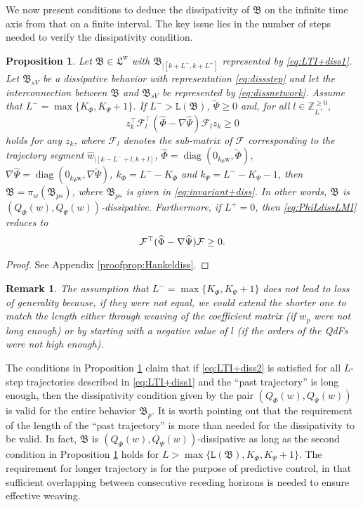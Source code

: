 \documentclass[11pt,print,draftcls,onecolumn,romanappendices]{ieeecolor}
\newtheorem{prop}[thm]{Proposition}
\newtheorem{rem}{Remark}
\DeclareMathOperator{\diag}{diag}
\newcommand{\Znn}[1]{\mathbb{Z}^{\geq0}_{#1}}
\newcommand{\LTI}[1]{\mathfrak{L}^{#1}}
\newcommand{\lag}[1]{\mathtt{L}\left(#1\right)}
\newcommand{\proj}[2]{\pi_{#1}\left(#2\right)}
\newcommand{\revise}[1]{{\color{black} #1}}
\newcommand{\B}{\mathfrak{B}}
\newcommand{\F}{\mathcal{F}}
\newcommand{\bint}[1]{{|[#1]}}
\begin{document}
We now present conditions to deduce the dissipativity of $\B$ on the infinite time axis from that on a finite interval. The key issue lies in the number of steps needed to verify the dissipativity condition.
\begin{prop}\label{prop:Hankeldiss}
	Let $\B\in\LTI{\mathrm{w}}$ with $\B_{\bint{k+L^-,k+L^+}}$ represented by \eqref{eq:LTI+diss1}. Let $\B_{sV}$ be a dissipative behavior with representation \eqref{eq:dissstep} and let the interconnection between $\B$ and $\B_{sV}$ be represented by \eqref{eq:dissnetwork}. Assume that $L^-=\max\{K_\Phi,K_\Psi+1\}$. If $L^->\lag{\B}$, $\widetilde{\Psi}\geq0$ and, for all $l\in\Znn{L^+}$,\revise{
		\begin{equation}\label{eq:PhiLdissSOS}
			z_k^\top\F_l^\top (\widehat{\Phi}-\nabla\widehat{\Psi})\F_lz_k\geq0
		\end{equation}
	holds for any $z_k$, where $\F_l$ denotes the sub-matrix of} $\F$ corresponding to the trajectory segment $\hat{w}_{\bint{k-L^-+l,k+l}}$, $\widehat{\Phi}=\diag(0_{k_\Phi\mathrm{w}},\widetilde{\Phi})$, $\nabla\widehat{\Psi}=\diag(0_{k_\Psi\mathrm{w}}, \nabla\widetilde{\Psi})$, $k_\Phi=L^--K_\Phi$ and $k_\Psi=L^--K_\Psi-1$, then $\B=\proj{w}{\B_{ps}}$, where $\B_{ps}$ is given in \eqref{eq:invariant+diss}. In other words, $\B$ is $(Q_\Phi(w),Q_\Psi(w))$-dissipative. \revise{Furthermore, if $L^+=0$, then \eqref{eq:PhiLdissLMI} reduces to}
	\begin{equation}\label{eq:PhiLdissLMI}
	    \revise{\F^\top (\widehat{\Phi}-\nabla\widehat{\Psi})\F\geq0.}
	\end{equation}
\end{prop}
\begin{proof}
	See Appendix \ref{proofprop:Hankeldiss}.
\end{proof}
\begin{rem}
	The assumption that $L^-=\max\{K_\Phi,K_\Psi+1\}$ does not lead to loss of generality because, if they were not equal, we could extend the shorter one to match the length either through weaving of the coefficient matrix (if $w_p$ were not long enough) or by starting with a negative value of $l$ (if the orders of the QdFs were not high enough).
\end{rem}

The conditions in Proposition \ref{prop:Hankeldiss} claim that if \eqref{eq:LTI+diss2} is satisfied for all $L$-step trajectories described in \eqref{eq:LTI+diss1} and the ``past trajectory'' is long enough, then the dissipativity condition given by the pair $(Q_\Phi(w),Q_\Psi(w))$ is valid for the entire behavior $\B_p$. It is worth pointing out that the requirement of the length of the ``past trajectory'' is more than needed for the dissipativity to be valid. In fact, $\B$ is $(Q_\Phi(w),Q_\Psi(w))$-dissipative as long as the second condition in Proposition \ref{prop:Hankeldiss} holds for $L>\max\{\lag{\B},K_\Phi,K_\Psi+1\}$. The requirement for longer trajectory is for the purpose of predictive control, in that sufficient overlapping between consecutive receding horizons is needed to ensure effective weaving. 
\end{document}
